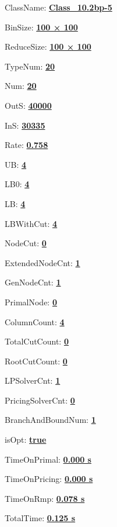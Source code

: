 \documentclass[11pt]{article}
\begin{document}
\pagestyle{empty}


ClassName: \underline{\textbf{Class_10.2bp-5}}
\par
BinSize: \underline{\textbf{100 × 100}}
\par
ReduceSize: \underline{\textbf{100 × 100}}
\par
TypeNum: \underline{\textbf{20}}
\par
Num: \underline{\textbf{20}}
\par
OutS: \underline{\textbf{40000}}
\par
InS: \underline{\textbf{30335}}
\par
Rate: \underline{\textbf{0.758}}
\par
UB: \underline{\textbf{4}}
\par
LB0: \underline{\textbf{4}}
\par
LB: \underline{\textbf{4}}
\par
LBWithCut: \underline{\textbf{4}}
\par
NodeCut: \underline{\textbf{0}}
\par
ExtendedNodeCnt: \underline{\textbf{1}}
\par
GenNodeCnt: \underline{\textbf{1}}
\par
PrimalNode: \underline{\textbf{0}}
\par
ColumnCount: \underline{\textbf{4}}
\par
TotalCutCount: \underline{\textbf{0}}
\par
RootCutCount: \underline{\textbf{0}}
\par
LPSolverCnt: \underline{\textbf{1}}
\par
PricingSolverCnt: \underline{\textbf{0}}
\par
BranchAndBoundNum: \underline{\textbf{1}}
\par
isOpt: \underline{\textbf{true}}
\par
TimeOnPrimal: \underline{\textbf{0.000 s}}
\par
TimeOnPricing: \underline{\textbf{0.000 s}}
\par
TimeOnRmp: \underline{\textbf{0.078 s}}
\par
TotalTime: \underline{\textbf{0.125 s}}
\par
\newpage


\end{document}
